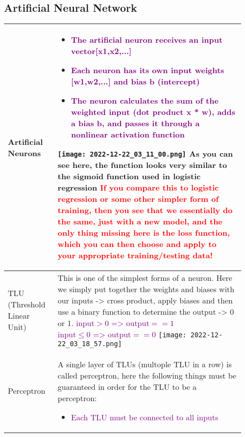\documentclass[main.tex,fontsize=8pt,paper=a4,paper=portrait,DIV=calc,]{scrartcl}
\begin{document}
\begin{table}[ht!]
\subsection{Artificial Neural Network}
\begin{tabular}{|m{0.2\linewidth}|m{0.755\linewidth}|}
\hline
Artificial Neurons &
\vspace{2mm}
\begin{itemize}
  \item \textcolor{purple}{The artificial neuron receives an input vector[x1,x2,...]}
  \item \textcolor{purple}{Each neuron has its own input weights [w1,w2,...] and \textbf{bias b} (intercept)}
\item \textcolor{purple}{The neuron calculates the sum of the weighted input (dot product x * w), adds a bias b, and passes it through a nonlinear \textbf{activation function}}
\end{itemize}
\texttt{[image: 2022-12-22\_03\_11\_00.png]}\newline
As you can see here, the function looks very similar to the \textbf{sigmoid} function used in logistic regression\newline 
\textcolor{red}{If you compare this to logistic regression or some other simpler form of training, then you see that we essentially do the same, just with a new model, and the only thing missing here is the loss function, which you can then choose and apply to your appropriate training/testing data!}\\
\hline
TLU (Threshold Linear Unit) & 
This is one of the simplest forms of a neuron. Here we simply put together the weights and biases with our inputs -> cross product, apply biases and then use a binary function to determine the output -> 0 or 1. \newline
\textcolor{purple}{\( \text{input} > 0 \text{ => } \text{output} == 1 \)}\newline
\textcolor{purple}{\( \text{input} \leq 0 \text{ => } \text{output} == 0 \)}\newline
\texttt{[image: 2022-12-22\_03\_18\_57.png]}
\\
\hline
Perceptron & 
A single layer of TLUs (multople TLU in a row) is called perceptron, here the following things must be guaranteed in order for the TLU to be a perceptron:\newline
\begin{itemize}
\item \textcolor{purple}{Each TLU must be connected to all inputs}

\end{itemize}
\end{tabular}
\end{table}
\end{document}
